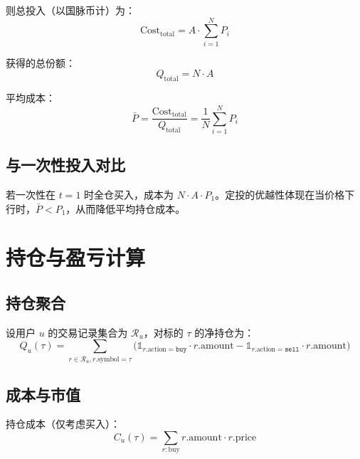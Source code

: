 \documentclass[12pt,a4paper]{article}
\begin{document}
则总投入（以国脉币计）为：
\begin{equation}
\mathrm{Cost}_{\mathrm{total}} = A \cdot \sum_{i=1}^{N} P_i
\end{equation}

获得的总份额：
\begin{equation}
Q_{\mathrm{total}} = N \cdot A
\end{equation}

平均成本：
\begin{equation}
\bar{P} = \frac{\mathrm{Cost}_{\mathrm{total}}}{Q_{\mathrm{total}}} = \frac{1}{N} \sum_{i=1}^{N} P_i
\end{equation}

\subsection{与一次性投入对比}

若一次性在 $t=1$ 时全仓买入，成本为 $N \cdot A \cdot P_1$。定投的优越性体现在当价格下行时，$\bar{P} < P_1$，从而降低平均持仓成本。

\section{持仓与盈亏计算}

\subsection{持仓聚合}

设用户 $u$ 的交易记录集合为 $\mathcal{R}_u$，对标的 $\tau$ 的净持仓为：
\begin{equation}
Q_u(\tau) = \sum_{r \in \mathcal{R}_u, r.\mathrm{symbol}=\tau} \bigl( \mathbb{1}_{r.\mathrm{action}=\mathtt{buy}} \cdot r.\mathrm{amount} - \mathbb{1}_{r.\mathrm{action}=\mathtt{sell}} \cdot r.\mathrm{amount} \bigr)
\end{equation}

\subsection{成本与市值}

持仓成本（仅考虑买入）：
\begin{equation}
C_u(\tau) = \sum_{r: \mathrm{buy}} r.\mathrm{amount} \cdot r.\mathrm{price}
\end{equation}
\end{document}
